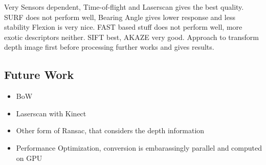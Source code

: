 Very Sensors dependent, Time-of-flight and Laserscan gives the best quality.
SURF does not perform well, Bearing Angle gives lower response and less stability
Flexion is very nice.
FAST based stuff does not perform well, more exotic descriptors neither.
SIFT best, AKAZE very good.
Approach to transform depth image first before processing further works and gives results.

\subsection{Future Work}

\begin{itemize}
    \item BoW
    \item Laserscan with Kinect
    \item Other form of Ransac, that considers the depth information
    \item Performance Optimization, conversion is embarassingly parallel and computed on GPU
\end{itemize}
